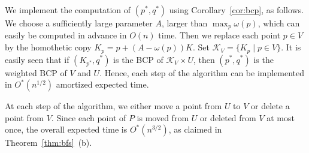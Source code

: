 \documentclass[11pt]{article}
\def\K{\mathcal{K}}
\def\marrow{\marginpar[\hfill$\longrightarrow$]{$\longleftarrow$}}
\def\micha#1{{\color{magenta} \textsc{(Micha says: }\marrow\textsf{#1})}}
\theoremstyle{definition}
\begin{document}
We implement the computation of $(p^*,q^*)$  using Corollary~\ref{cor:bcp}, as follows.
We choose a sufficiently large parameter $A$, larger than $\max_p \omega(p)$, which can easily be 
computed in advance in $O(n)$ time. Then we replace each point $p\in V$ by the homothetic copy 
$K_p = p + (A-\omega(p))K$. Set $\K_V = \{ K_p \mid p \in V\}$. It is easily seen that if 
$(K_{p^*}, q^*)$ is the BCP of $\K_V \times U$, then $(p^*,q^*)$ is the weighted BCP of 
$V$ and $U$. Hence, each step of the
algorithm can be implemented in $O^*(n^{1/2})$ amortized expected time. 

At each step of the algorithm, we either move a point from $U$ to $V$ or delete a point from $V$.
Since each point of $P$ is moved from $U$ or deleted from $V$ at most once, the overall 
expected time is $O^*(n^{3/2})$, as claimed in Theorem~\ref{thm:bfs}~(b).
\fi

\end{document}

